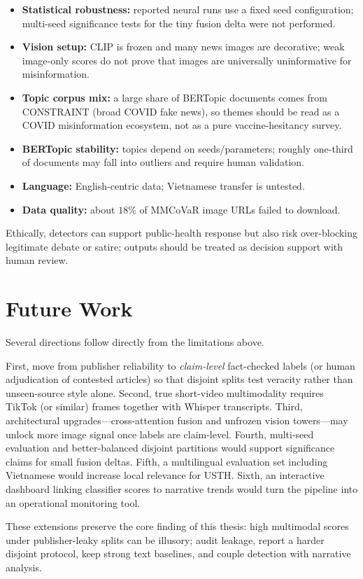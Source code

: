 \documentclass[12pt, a4paper]{report}
\begin{document}
\begin{itemize}
  \item \textbf{Statistical robustness:} reported neural runs use a fixed seed configuration; multi-seed significance tests for the tiny fusion delta were not performed.
  \item \textbf{Vision setup:} CLIP is frozen and many news images are decorative; weak image-only scores do not prove that images are universally uninformative for misinformation.
  \item \textbf{Topic corpus mix:} a large share of BERTopic documents comes from CONSTRAINT (broad COVID fake news), so themes should be read as a COVID misinformation ecosystem, not as a pure vaccine-hesitancy survey.
  \item \textbf{BERTopic stability:} topics depend on seeds/parameters; roughly one-third of documents may fall into outliers and require human validation.
  \item \textbf{Language:} English-centric data; Vietnamese transfer is untested.
  \item \textbf{Data quality:} about $18\%$ of MMCoVaR image URLs failed to download.
\end{itemize}
Ethically, detectors can support public-health response but also risk over-blocking legitimate debate or satire; outputs should be treated as decision support with human review.

\section{Future Work}
\label{sec:future-work}

Several directions follow directly from the limitations above.

First, move from publisher reliability to \emph{claim-level} fact-checked labels (or human adjudication of contested articles) so that disjoint splits test veracity rather than unseen-source style alone.
Second, true short-video multimodality requires TikTok (or similar) frames together with Whisper transcripts.
Third, architectural upgrades---cross-attention fusion and unfrozen vision towers---may unlock more image signal once labels are claim-level.
Fourth, multi-seed evaluation and better-balanced disjoint partitions would support significance claims for small fusion deltas.
Fifth, a multilingual evaluation set including Vietnamese would increase local relevance for USTH.
Sixth, an interactive dashboard linking classifier scores to narrative trends would turn the pipeline into an operational monitoring tool.

These extensions preserve the core finding of this thesis: high multimodal scores under publisher-leaky splits can be illusory; audit leakage, report a harder disjoint protocol, keep strong text baselines, and couple detection with narrative analysis.

\clearpage

\printbibliography[title=References]
\end{document}
